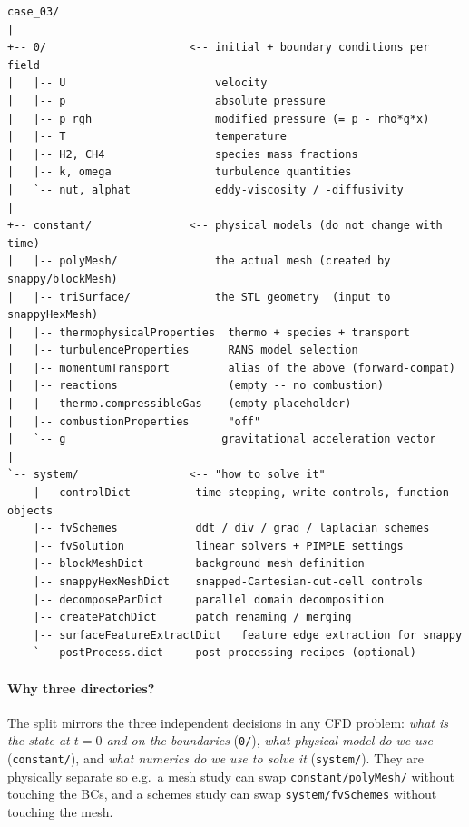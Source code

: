 \documentclass[11pt,a4paper]{article}
\begin{document}
{\small
\begin{verbatim}
case_03/
|
+-- 0/                      <-- initial + boundary conditions per field
|   |-- U                       velocity
|   |-- p                       absolute pressure
|   |-- p_rgh                   modified pressure (= p - rho*g*x)
|   |-- T                       temperature
|   |-- H2, CH4                 species mass fractions
|   |-- k, omega                turbulence quantities
|   `-- nut, alphat             eddy-viscosity / -diffusivity
|
+-- constant/               <-- physical models (do not change with time)
|   |-- polyMesh/               the actual mesh (created by snappy/blockMesh)
|   |-- triSurface/             the STL geometry  (input to snappyHexMesh)
|   |-- thermophysicalProperties  thermo + species + transport
|   |-- turbulenceProperties      RANS model selection
|   |-- momentumTransport         alias of the above (forward-compat)
|   |-- reactions                 (empty -- no combustion)
|   |-- thermo.compressibleGas    (empty placeholder)
|   |-- combustionProperties      "off"
|   `-- g                        gravitational acceleration vector
|
`-- system/                 <-- "how to solve it"
    |-- controlDict          time-stepping, write controls, function objects
    |-- fvSchemes            ddt / div / grad / laplacian schemes
    |-- fvSolution           linear solvers + PIMPLE settings
    |-- blockMeshDict        background mesh definition
    |-- snappyHexMeshDict    snapped-Cartesian-cut-cell controls
    |-- decomposeParDict     parallel domain decomposition
    |-- createPatchDict      patch renaming / merging
    |-- surfaceFeatureExtractDict   feature edge extraction for snappy
    `-- postProcess.dict     post-processing recipes (optional)
\end{verbatim}
}

\paragraph{Why three directories?}
The split mirrors the three independent decisions in any CFD problem:
\emph{what is the state at $t=0$ and on the boundaries} (\texttt{0/}),
\emph{what physical model do we use} (\texttt{constant/}), and
\emph{what numerics do we use to solve it} (\texttt{system/}). They
are physically separate so e.g.\ a mesh study can swap
\texttt{constant/polyMesh/} without touching the BCs, and a
schemes study can swap \texttt{system/fvSchemes} without touching the
mesh.

\clearpage
\end{document}
